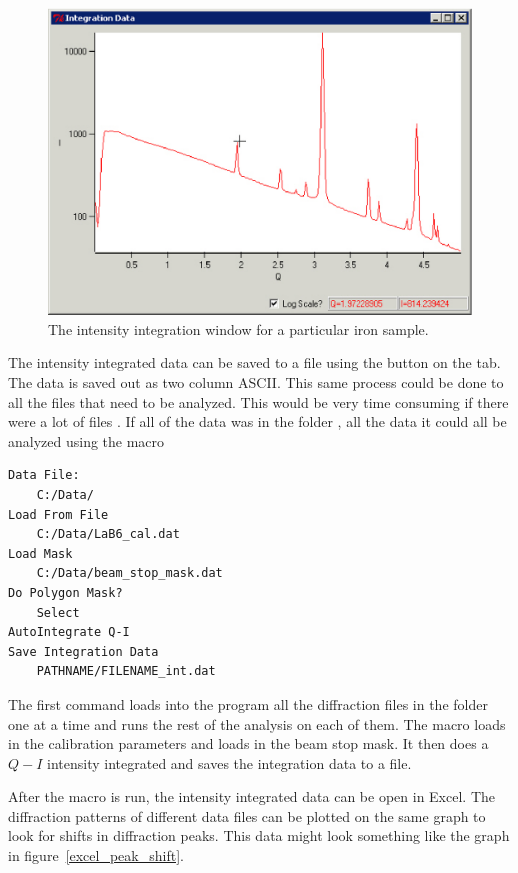 \begin{figure}
    \centering
    \includegraphics[scale=.75]
    {figures/iron_intensity.eps}
    \caption{The intensity integration window for 
    a particular iron sample.}
    \label{iron_intensity}
\end{figure}

The intensity integrated data can be saved to a file
using the  button on the  tab. 
The data is saved out as two column ASCII. This same 
process could be done to all the files that need to be 
analyzed. This would be very time consuming if there were a lot of files . 
If all of the data was in the folder , all the data 
it could all be analyzed using the macro
\begin{lstlisting}
Data File:
	C:/Data/
Load From File
    C:/Data/LaB6_cal.dat
Load Mask
    C:/Data/beam_stop_mask.dat
Do Polygon Mask?
    Select
AutoIntegrate Q-I
Save Integration Data
    PATHNAME/FILENAME_int.dat
\end{lstlisting}
The first command loads into the program all the
diffraction files in the folder 
one at a time and runs the rest of the analysis on
each of them. The macro loads in the calibration parameters
and loads in the beam stop 
mask. It then does a $Q-I$ intensity integrated and 
saves the integration data to a file. 

After the macro is run, the intensity integrated data can be open 
in Excel. 
The diffraction patterns of different data files can be plotted on
the same graph to look for shifts in diffraction peaks. 
This data might look something like the graph 
in figure~\ref{excel_peak_shift}.

